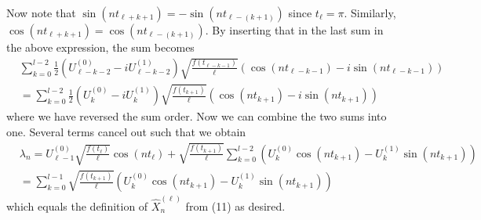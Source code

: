 \documentclass{article}
\begin{document}
Now note that $\sin\left(n t_{\ell+k+1}\right) = -\sin(nt_{\ell-(k+1)})$ since $t_\ell = \pi$. Similarly, $\cos\left(n t_{\ell+k+1}\right) = \cos(nt_{\ell-(k+1)})$. By inserting that in the last sum in the above expression, the sum becomes
\begin{align*}
&\sum_{k=0}^{l-2}\frac{1}{2} \left( U^{(0)}_{\ell-k-2}- i U^{(1)}_{\ell-k-2} \right) \sqrt{\frac{f(t_{\ell-k-1})}{\ell}} \left( \cos\left(n t_{\ell-k-1}\right) - i\sin\left(n t_{\ell-k-1}\right)\right)\\
& =\sum_{k=0}^{l-2}\frac{1}{2} \left( U^{(0)}_{k}- i U^{(1)}_{k} \right) \sqrt{\frac{f(t_{k+1})}{\ell}} \left( \cos\left(n t_{k+1}\right) - i\sin\left(n t_{k+1}\right)\right)
\end{align*}
where we have reversed the sum order. Now we can combine the two sums into one. Several terms cancel out such that we obtain
\begin{align*}
&\lambda_n = U^{(0)}_{\ell-1} \sqrt{\frac{f(t_\ell)}{\ell}}\cos(nt_\ell)+ \sqrt{\frac{f(t_{k+1})}{\ell}} \sum_{k=0}^{l-2} \left(U^{(0)}_k\cos\left(n t_{k+1}\right)-U^{(1)}_{k}\sin\left(n t_{k+1}\right)\right)\\
& = \sum_{k=0}^{l-1}\sqrt{\frac{f(t_{k+1})}{\ell}}\left(U^{(0)}_k\cos\left(n t_{k+1}\right)-U^{(1)}_{k}\sin\left(n t_{k+1}\right)\right)
\end{align*}
which equals the definition of $\hat{X}_n^{(\ell)}$ from (11) as desired.

\newpage
{}


\end{document}
